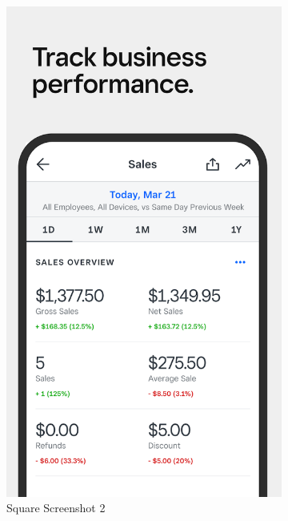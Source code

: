 \begin{figure}[!htb]
\begin{subfigure}[b]{0.32\textwidth}
        \includegraphics[width=\textwidth]{images/square_screenshot_2.png}
        \caption{Square Screenshot 2}
        \label{fig:square_2}
    \end{subfigure}
    \hfill
    \begin{subfigure}[b]{0.32\textwidth}
        \centering

\end{subfigure}
\end{figure}

